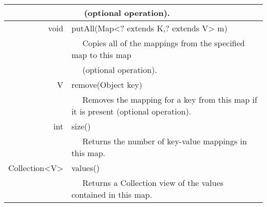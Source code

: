 \documentclass[iutinfo,10pt]{ustl-tdtp}
\begin{document}
\begin{center}
\begin{tabular}{|r|l|}
        &~~ (optional operation).\\
\hline
 void	&putAll(Map<? extends K,? extends V> m) \\
        &~~  Copies all of the mappings from the specified map to this map\\
        &~~ (optional operation).\\
\hline
 V	&remove(Object key) \\
        &~~  Removes the mapping for a key from this map if it is present (optional operation).\\
\hline
 int	&size() \\
        &~~  Returns the number of key-value mappings in this map.\\
\hline
 Collection<V>&	values() \\
          &~~ Returns a Collection view of the values contained in this map.\\
\hline
\end{tabular}
\end{center}
\end{document}
